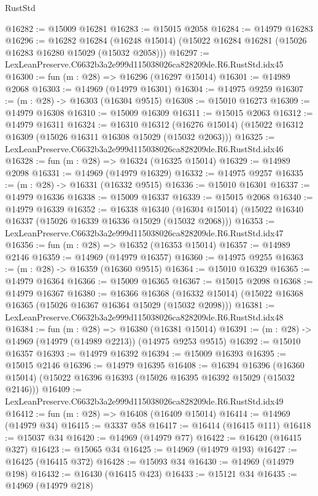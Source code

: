 \begin{lexlean}{RustStd}
\begin{coremodule}
@16282 := @15009 @16281
@16283 := @15015 @2058
@16284 := @14979 @16283
@16296 := @16282
    @16284
    (@16248 @15014)
    (@15022 @16284 @16281 (@15026 @16283 @16280 @15029 (@15032 @2058)))
@16297 := LexLeanPreserve.C6632b3a2e999d115038026ca828209de.R6.RustStd.idx45
@16300 := fun (m : @28) => @16296 (@16297 @15014)
@16301 := @14989 @2068
@16303 := @14969 (@14979 @16301)
@16304 := @14975 @9259
@16307 := (m : @28) -> @16303 (@16304 @9515)
@16308 := @15010 @16273
@16309 := @14979 @16308
@16310 := @15009 @16309
@16311 := @15015 @2063
@16312 := @14979 @16311
@16324 := @16310
    @16312
    (@16276 @15014)
    (@15022 @16312 @16309 (@15026 @16311 @16308 @15029 (@15032 @2063)))
@16325 := LexLeanPreserve.C6632b3a2e999d115038026ca828209de.R6.RustStd.idx46
@16328 := fun (m : @28) => @16324 (@16325 @15014)
@16329 := @14989 @2098
@16331 := @14969 (@14979 @16329)
@16332 := @14975 @9257
@16335 := (m : @28) -> @16331 (@16332 @9515)
@16336 := @15010 @16301
@16337 := @14979 @16336
@16338 := @15009 @16337
@16339 := @15015 @2068
@16340 := @14979 @16339
@16352 := @16338
    @16340
    (@16304 @15014)
    (@15022 @16340 @16337 (@15026 @16339 @16336 @15029 (@15032 @2068)))
@16353 := LexLeanPreserve.C6632b3a2e999d115038026ca828209de.R6.RustStd.idx47
@16356 := fun (m : @28) => @16352 (@16353 @15014)
@16357 := @14989 @2146
@16359 := @14969 (@14979 @16357)
@16360 := @14975 @9255
@16363 := (m : @28) -> @16359 (@16360 @9515)
@16364 := @15010 @16329
@16365 := @14979 @16364
@16366 := @15009 @16365
@16367 := @15015 @2098
@16368 := @14979 @16367
@16380 := @16366
    @16368
    (@16332 @15014)
    (@15022 @16368 @16365 (@15026 @16367 @16364 @15029 (@15032 @2098)))
@16381 := LexLeanPreserve.C6632b3a2e999d115038026ca828209de.R6.RustStd.idx48
@16384 := fun (m : @28) => @16380 (@16381 @15014)
@16391 := (m : @28) -> @14969 (@14979 (@14989 @2213)) (@14975 @9253 @9515)
@16392 := @15010 @16357
@16393 := @14979 @16392
@16394 := @15009 @16393
@16395 := @15015 @2146
@16396 := @14979 @16395
@16408 := @16394
    @16396
    (@16360 @15014)
    (@15022 @16396 @16393 (@15026 @16395 @16392 @15029 (@15032 @2146)))
@16409 := LexLeanPreserve.C6632b3a2e999d115038026ca828209de.R6.RustStd.idx49
@16412 := fun (m : @28) => @16408 (@16409 @15014)
@16414 := @14969 (@14979 @34)
@16415 := @3337 @58
@16417 := @16414 (@16415 @111)
@16418 := @15037 @34
@16420 := @14969 (@14979 @77)
@16422 := @16420 (@16415 @327)
@16423 := @15065 @34
@16425 := @14969 (@14979 @193)
@16427 := @16425 (@16415 @372)
@16428 := @15093 @34
@16430 := @14969 (@14979 @198)
@16432 := @16430 (@16415 @423)
@16433 := @15121 @34
@16435 := @14969 (@14979 @218)

\end{coremodule}
\end{lexlean}
